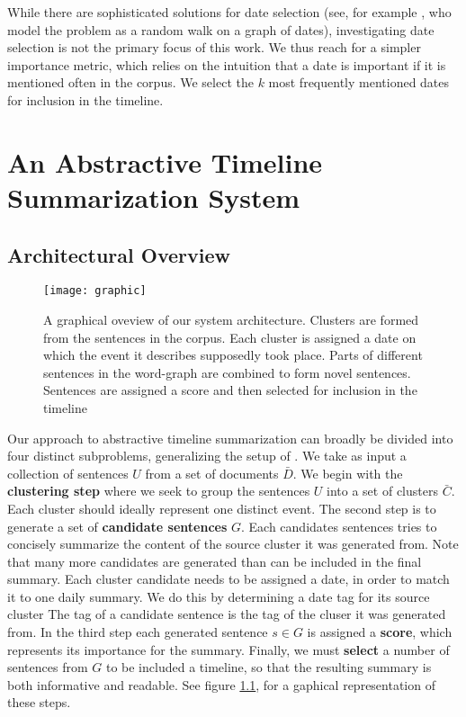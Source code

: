 \documentclass[a4paper,BCOR=10mm]{report}
\numberwithin{lemma}{chapter}
\numberwithin{definition}{chapter}
\begin{document}
While there are sophisticated solutions for date selection (see, for example \citet{tran-datesel}, who model the problem as a random walk on a graph of dates), investigating date selection is not the primary focus of this work.
We thus reach for a simpler importance metric, which relies on the intuition that a date is important if it is mentioned often in the corpus. We select the $k$ most frequently mentioned dates for inclusion in the timeline.


\chapter{An Abstractive Timeline Summarization System}

\section{Architectural Overview}

\begin{figure}
\texttt{[image: graphic]}
\caption{A graphical oveview of our system architecture. Clusters are formed from the sentences in the corpus. Each cluster is assigned a date on which the event it describes supposedly took place. Parts of different sentences in the word-graph are combined to form novel sentences. Sentences are assigned a score and then selected for inclusion in the timeline}
\label{fig:arch-overview}
\end{figure}

Our approach to abstractive timeline summarization can broadly be divided into four distinct subproblems, generalizing the setup of \citet{banerjee}.
We take as input a collection of sentences $U$ from a set of documents $\bar{D}$.
We begin with the \textbf{clustering step} where we seek to group the sentences $U$ into a set of clusters $\bar{C}$. Each cluster should ideally represent one distinct event.
The second step is to generate a set of \textbf{candidate sentences} $G$. Each candidates sentences tries to concisely summarize the content of the source cluster it was generated from. Note that many more candidates are generated than can be included in the final summary. Each cluster candidate needs to be assigned a date, in order to match it to one daily summary. We do this by determining a date tag for its source cluster The tag of a candidate sentence is the tag of the cluser it was generated from.
In the third step each generated sentence $s \in G$ is assigned a \textbf{score}, which represents its importance for the summary.
Finally, we must \textbf{select} a number of sentences from $G$ to be included a timeline, so that the resulting summary is both informative and readable. See figure \ref{fig:arch-overview}, for a gaphical representation of these steps.
\end{document}
